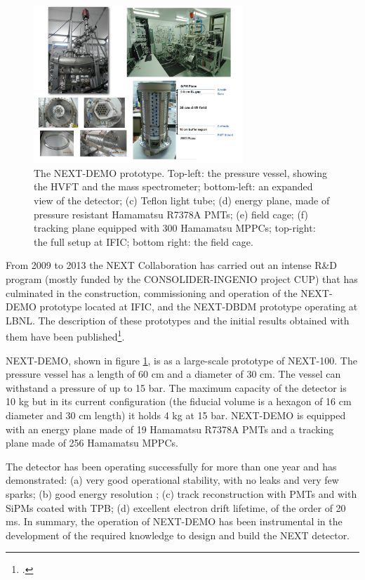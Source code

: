 \documentclass[a4paper,11pt,oneside]{article}
\begin{document}
\begin{figure}
\centering
\includegraphics[width=0.7\textwidth]{img/DemoSetup2.png}
\caption{\small The NEXT-DEMO prototype. Top-left: the pressure vessel, showing the HVFT and the mass spectrometer; bottom-left: an expanded view of the detector; (c) Teflon light tube; (d) energy plane, made of pressure resistant Hamamatsu R7378A PMTs; (e) field cage; (f) tracking plane equipped with 300 Hamamatsu MPPCs; top-right: the full setup at IFIC; bottom right: the field cage.} \label{fig.DEMO}
\end{figure}

From 2009 to 2013 the NEXT Collaboration has carried out an intense R\&D program (mostly funded by the CONSOLIDER-INGENIO project CUP) that has culminated in the construction, commissioning and operation of the NEXT-DEMO prototype located at IFIC, and the NEXT-DBDM prototype operating at LBNL. The description of these prototypes and the initial results obtained with them have been published\footcite{Alvarez:2012hh, Alvarez:2012nd, Alvarez:2012hu}.

NEXT-DEMO, shown in figure \ref{fig.DEMO}, is as a large-scale prototype of NEXT-100. The pressure vessel has a length of 60 cm and a diameter of 30 cm. The vessel can withstand a pressure of up to 15 bar. The maximum capacity of the detector is 10 kg but in its current configuration (the fiducial volume is a hexagon of 16 cm diameter and 30 cm length) it holds 4 kg at 15 bar. NEXT-DEMO is  equipped with an energy plane made of 19 Hamamatsu R7378A PMTs and a tracking plane made of 256 Hamamatsu MPPCs. 

The detector has been operating successfully for more than one year and has demonstrated: (a) very good operational stability, with no leaks and very few sparks; (b) good energy resolution ; (c) track reconstruction with PMTs and with SiPMs coated with TPB; (d) excellent electron drift lifetime, of the order of 20 ms. In summary, the operation of NEXT-DEMO has been instrumental in the development of the required knowledge to design and build the NEXT detector.
\end{document}
